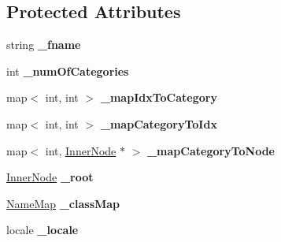 \subsection*{Protected Attributes}
\begin{DoxyCompactItemize}
\item 
\hypertarget{classMultiBoost_1_1ClassHierarchy_a0dd01532790f26fa41b89e4017612786}{string {\bfseries \-\_\-fname}}\label{classMultiBoost_1_1ClassHierarchy_a0dd01532790f26fa41b89e4017612786}

\item 
\hypertarget{classMultiBoost_1_1ClassHierarchy_ac171829f2c4a539a46c6a2aebd1b62a0}{int {\bfseries \-\_\-num\-Of\-Categories}}\label{classMultiBoost_1_1ClassHierarchy_ac171829f2c4a539a46c6a2aebd1b62a0}

\item 
\hypertarget{classMultiBoost_1_1ClassHierarchy_a058ca727b90822671b2fc0727c060450}{map$<$ int, int $>$ {\bfseries \-\_\-map\-Idx\-To\-Category}}\label{classMultiBoost_1_1ClassHierarchy_a058ca727b90822671b2fc0727c060450}

\item 
\hypertarget{classMultiBoost_1_1ClassHierarchy_ae1c939fb5e12f6c07705d55b29577d3f}{map$<$ int, int $>$ {\bfseries \-\_\-map\-Category\-To\-Idx}}\label{classMultiBoost_1_1ClassHierarchy_ae1c939fb5e12f6c07705d55b29577d3f}

\item 
\hypertarget{classMultiBoost_1_1ClassHierarchy_ad5740b73a3cc710673732f1e8d8a2e12}{map$<$ int, \hyperlink{classMultiBoost_1_1InnerNode}{Inner\-Node} $\ast$ $>$ {\bfseries \-\_\-map\-Category\-To\-Node}}\label{classMultiBoost_1_1ClassHierarchy_ad5740b73a3cc710673732f1e8d8a2e12}

\item 
\hypertarget{classMultiBoost_1_1ClassHierarchy_a0e4c82805c434d549445625d3d355964}{\hyperlink{classMultiBoost_1_1InnerNode}{Inner\-Node} {\bfseries \-\_\-root}}\label{classMultiBoost_1_1ClassHierarchy_a0e4c82805c434d549445625d3d355964}

\item 
\hypertarget{classMultiBoost_1_1ClassHierarchy_a5d4a17bb474c0d7fcfb6388fe2c726c5}{\hyperlink{classMultiBoost_1_1NameMap}{Name\-Map} {\bfseries \-\_\-class\-Map}}\label{classMultiBoost_1_1ClassHierarchy_a5d4a17bb474c0d7fcfb6388fe2c726c5}

\item 
\hypertarget{classMultiBoost_1_1ClassHierarchy_aefb7d7ec8d3db7eb963bbbc5aea8a483}{locale {\bfseries \-\_\-locale}}\label{classMultiBoost_1_1ClassHierarchy_aefb7d7ec8d3db7eb963bbbc5aea8a483}

\end{DoxyCompactItemize}


